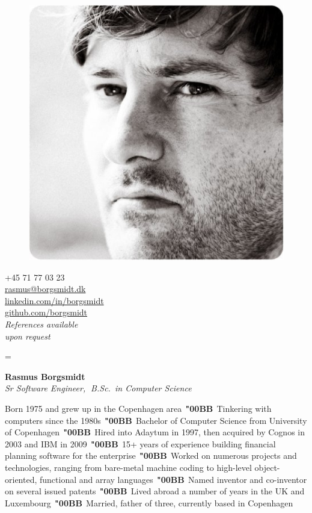 \documentclass[a4paper,10pt,final]{memoir}
\newcommand{\Sep}{\vspace{1.5em}}
\newcommand{\Dot}{\mbox{\color{SpotColor}$\,\;$\textbf{\char"00BB}$\,\;$}}
\newenvironment{inlinepar}[1]
	{\ignorespaces{\lowsmallcapsspacing{\textbf{#1}}}}
	{\ignorespacesafterend}
\begin{document}
\begin{figure}
	\hfill
	\includegraphics[width=0.6\columnwidth]{../media/borgsmidt.jpg}
	\vspace{-7cm}
\end{figure}

\begin{flushright}\footnotesize
  +45 71 77 03 23\\
  \href{mailto:rasmus@borgsmidt.dk}{rasmus@borgsmidt.dk}\\
  \href{http://dk.linkedin.com/in/borgsmidt}{linkedin.com/in/borgsmidt}\\
  \href{https://github.com/borgsmidt}{github.com/borgsmidt}\\[12pt]
  {\em References available\\ upon request}
\end{flushright}\normalsize
\framebreak

\font%
\font%
\font=\font%

\huge{\textbf{Rasmus Borgsmidt}} \\
\Large{\color{SpotColor}\em Sr Software Engineer,$\;$ B.Sc.~in Computer Science}

\normalsize\normalfont

\Sep\begin{inlinepar}{about me}
  Born 1975 and grew up in the Copenhagen area\Dot Tinkering with computers
  since the 1980s\Dot Bachelor of Computer Science from University of
  Copenhagen\Dot Hired into Adaytum in 1997, then acquired by \mbox{Cognos} in
  2003 and IBM in 2009\Dot 15+ years of experience building financial planning
  software for the enterprise\Dot Worked on numerous projects and technologies,
  ranging from bare-metal machine coding to high-level object-oriented,
  functional and array languages\Dot Named inventor and co-inventor on several
  \mbox{issued} patents\Dot Lived abroad a number of years in the UK and
  Luxembourg\Dot Married, father of three, currently based in Copenhagen
\end{inlinepar}
\end{document}
